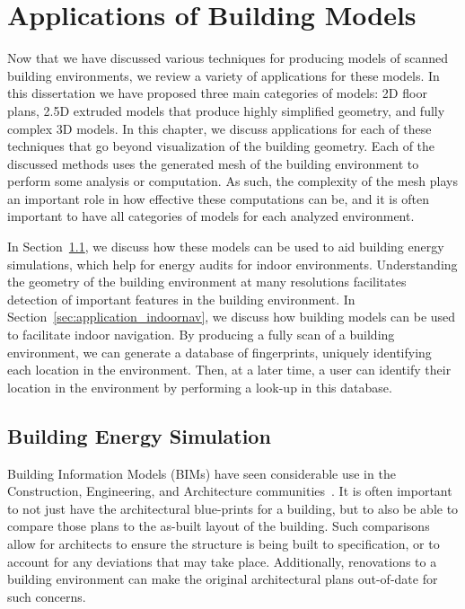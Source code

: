 \documentclass[12pt,onecolumn,oneside]{book}
\begin{document}
\chapter{Applications of Building Models}
\label{ch:applications}

Now that we have discussed various techniques for producing models of scanned building environments, we review a variety of applications for these models.  In this dissertation we have proposed three main categories of models:  2D floor plans, 2.5D extruded models that produce highly simplified geometry, and fully complex 3D models.  In this chapter, we discuss applications for each of these techniques that go beyond visualization of the building geometry.  Each of the discussed methods uses the generated mesh of the building environment to perform some analysis or computation.  As such, the complexity of the mesh plays an important role in how effective these computations can be, and it is often important to have all categories of models for each analyzed environment.

In Section~\ref{sec:application_energyplus}, we discuss how these models can be used to aid building energy simulations, which help for energy audits for indoor environments.  Understanding the geometry of the building environment at many resolutions facilitates detection of important features in the building environment.  In Section~\ref{sec:application_indoornav}, we discuss how building models can be used to facilitate indoor navigation.  By producing a fully scan of a building environment, we can generate a database of fingerprints, uniquely identifying each location in the environment.  Then, at a later time, a user can identify their location in the environment by performing a look-up in this database.

\section{Building Energy Simulation}
\label{sec:application_energyplus}

Building Information Models (BIMs) have seen considerable use in the Construction, Engineering, and Architecture communities~\cite{AutodeskBIM}.  It is often important to not just have the architectural blue-prints for a building, but to also be able to compare those plans to the as-built layout of the building.  Such comparisons allow for architects to ensure the structure is being built to specification, or to account for any deviations that may take place.  Additionally, renovations to a building environment can make the original architectural plans out-of-date for such concerns.
\end{document}
